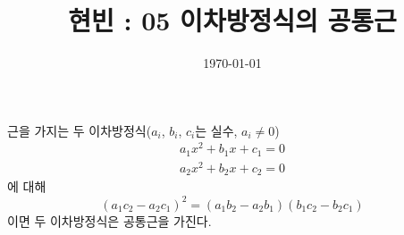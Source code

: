 \documentclass{article}
\begin{document}
\title{현빈 : 05 이차방정식의 공통근}
\author{}
\date{\today}
\maketitle

\noindent
\begin{mdframed}[frametitle={17장의 한 정리(p191)의 역}]
근을 가지는 두 이차방정식(\(a_i\), \(b_i\), \(c_i\)는 실수, \(a_i\neq0\))
\begin{gather}
a_1x^2+b_1x+c_1=0\\
a_2x^2+b_2x+c_2=0
\end{gather}
에 대해
\begin{equation}
(a_1c_2-a_2c_1)^2=(a_1b_2-a_2b_1)(b_1c_2-b_2c_1)
\end{equation}
이면 두 이차방정식은 공통근을 가진다.
\end{mdframed}
\end{document}
